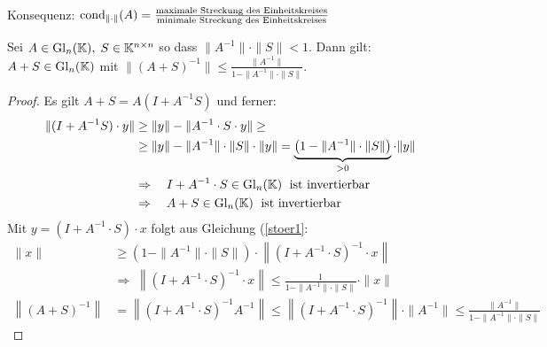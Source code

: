 Konsequenz: $\mathrm{cond}_{\| \cdot \|}(A) = \frac{\text{maximale Streckung des Einheitskreises}}
{\text{minimale Streckung des Einheitskreises}}$

\begin{Lemma}[Störungslemma]
  Sei $A \in \mathrm{Gl}_n(\mathbb K), \; S \in \mathbb K^{n \times n}$ so dass
  $\|A^{-1}\| \cdot \|S\| < 1$. Dann gilt: $A + S \in \mathrm{Gl}_n(\mathbb K)$ mit
  $\|(A + S)^{-1}\| \le \frac{\|A^{-1}\|}{1 - \|A^{-1}\| \cdot \|S\|}$.
\end{Lemma}
\begin{proof}
Es gilt $A + S = A(I + A^{-1} S)$ und ferner:
\begin{align}
   \nonumber
   \|(I + A^{-1} S) \cdot y\| &\ge \|y\| - \|A^{-1} \cdot S \cdot y\|  \ge \\
   \label{stoer1}
   & \ge \|y\| - \|A^{-1}\| \cdot \| S \| \cdot \|y\| =
   \underbrace {\left( 1 - \|A^{-1}\| \cdot \|S\| \right)}_{> 0}  \cdot \|y\| \\
   \nonumber
   & \Rightarrow \quad I + A^{-1} \cdot S  \in \mathrm{Gl}_n(\mathbb K) \; \text{ ist invertierbar}\\
   \nonumber
   & \Rightarrow \quad A + S \in \mathrm{Gl}_n(\mathbb K) \; \text{ ist invertierbar}
\end{align}
Mit $y = (I + A^{-1} \cdot S) \cdot x$ folgt aus Gleichung (\ref{stoer1}:
\begin{align*}
   \|x\| & \ge \left( 1 - \|A^{-1}\| \cdot \|S\| \right) \cdot
     \left\| (I + A^{-1} \cdot S)^{-1} \cdot x \right\| \\
  & \Rightarrow \; \left\| (I + A^{-1} \cdot S)^{-1} \cdot x \right\| \le
     \frac{1}{1 - \|A^{-1}\| \cdot \|S\|} \cdot \|x\|\\
     \left\|(A+S)^{-1}\right\|  & = \left\| (I + A^{-1} \cdot S)^{-1} A^{-1} \right\| \le
     \left\| (I + A^{-1} \cdot S)^{-1} \right\|\cdot \| A^{-1} \| \le
       \frac{\|A^{-1}\|}{1 - \|A^{-1}\| \cdot \|S\|}
\end{align*}
\end{proof}

